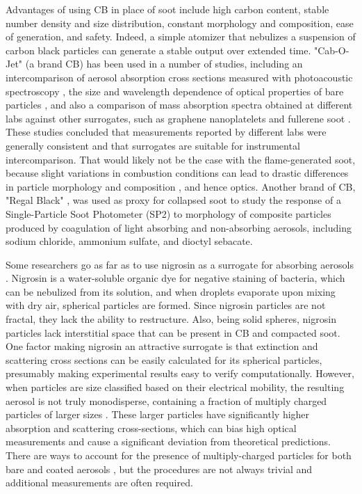 Advantages of using CB in place of soot include high carbon content, stable number density and size distribution, constant morphology and composition, ease of generation, and safety. Indeed, a simple atomizer that nebulizes a suspension of carbon black particles can generate a stable output over extended time. "Cab-O-Jet" (a brand CB) has been used in a number of studies, including an intercomparison of aerosol absorption cross sections measured with photoacoustic spectroscopy \citep{RN3}, the size and wavelength dependence of optical properties of bare particles \citep{RN4}, and also a comparison of mass absorption spectra obtained at different labs against other surrogates, such as graphene nanoplatelets and fullerene soot \citep{RN63}. These studies concluded that measurements reported by different labs were generally consistent and that surrogates are suitable for instrumental intercomparison. That would likely not be the case with the flame-generated soot, because slight variations in combustion conditions can lead to drastic differences in particle morphology and composition \citep{moore2014mapping}, and hence optics. Another brand of CB, "Regal Black" \citep{RN65}, was used as proxy for collapsed soot to study the response of a Single-Particle Soot Photometer (SP2) to morphology of composite particles produced by coagulation of light absorbing and non-absorbing aerosols, including sodium chloride, ammonium sulfate, and dioctyl sebacate.

Some researchers go as far as to use nigrosin as a surrogate for absorbing aerosols \citep{RN8,RN54,RN55,RN56,RN57,drinovec2022dual}. Nigrosin is a water-soluble organic dye for negative staining of bacteria, which can be nebulized from its solution, and when droplets evaporate upon mixing with dry air, spherical particles are formed. Since nigrosin particles are not fractal, they lack the ability to restructure. Also, being solid spheres, nigrosin particles lack interstitial space that can be present in CB and compacted soot. One factor making nigrosin an attractive surrogate is that extinction and scattering cross sections can be easily calculated for its spherical particles, presumably making experimental results easy to verify computationally. However, when particles are size classified based on their electrical mobility, the resulting aerosol is not truly monodisperse, containing a fraction of multiply charged particles of larger sizes \citep{mcmurry2002relationship,pagels2009processing}. These larger particles have significantly higher absorption and scattering cross-sections, which can bias high optical measurements \citep{RN50} and cause a significant deviation from theoretical predictions. There are ways to account for the presence of multiply-charged particles for both bare and coated aerosols \citep{RN67, RN77}, but the procedures are not always trivial and additional measurements are often required.

